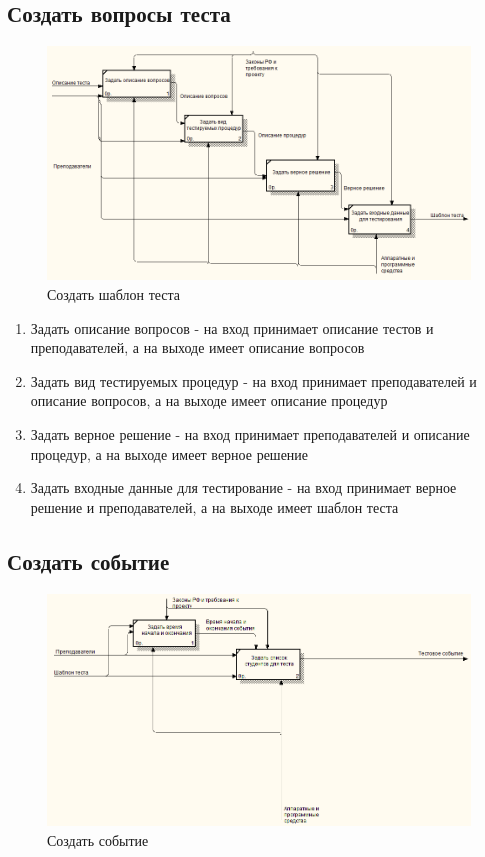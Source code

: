    \subsection{Создать вопросы теста}
    \begin{figure}[H]
        \includegraphics[width=\textwidth, center]{../img/idef0/CreateTemplateQuestions.png}
        \caption{Создать шаблон теста}
    \end{figure}
    \begin{enumerate}
        \item Задать описание вопросов - на вход принимает описание тестов и преподавателей,
        а на выходе имеет описание вопросов
        \item Задать вид тестируемых процедур - на вход принимает преподавателей и
        описание вопросов, а на выходе имеет описание процедур
        \item Задать верное решение - на вход принимает преподавателей и описание процедур,
        а на выходе имеет верное решение
        \item Задать входные данные для тестирование - на вход принимает верное решение
        и преподавателей, а на выходе имеет шаблон теста
    \end{enumerate}

    \subsection{Создать событие}
    \begin{figure}[H]
        \includegraphics[width=\textwidth, center]{../img/idef0/CreateInstance.png}
        \caption{Создать событие}
    \end{figure}
    
